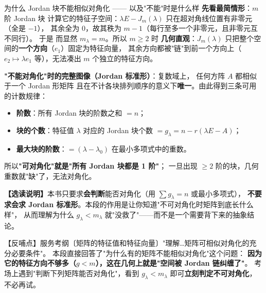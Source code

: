\begin{fdeep}{为什么 Jordan 块不能相似对角化 —— 以及"不能"时是什么样}
\textbf{先看最简情形}：$m$ 阶 Jordan 块
计算它的特征子空间：$\lambda E-J_{m}(\lambda)$ 只在超对角线位置有非零元（全是 $-1$），
其余全为 $0$，故其秩为 $m-1$（每行至多一个非零元，且非零元互不同行）。
于是
而显然 $m_{\lambda}=m$。所以 $m\ge2$ 时
\textbf{几何直观}：$J_{m}(\lambda)$ 只把整个空间的\textbf{一个方向}（$e_1$）固定为特征向量，
其余方向都被"链"到前一个方向上（$e_2\mapsto\lambda e_1$ 等），无法凑出 $m$ 个独立的特征方向。

\medskip
\textbf{"不能对角化"时的完整图像（Jordan 标准形）}：复数域上，
任何方阵 $A$ 都相似于一个 Jordan 形矩阵
且在不计各块排列顺序的意义下\textbf{唯一}。由此得到三条可用的计数规律：
\begin{itemize}[leftmargin=2.2em,itemsep=0.22em]
\item \textbf{阶数}：所有 Jordan 块的阶数之和 $=n$；
\item \textbf{块的个数}：特征值 $\lambda$ 对应的 Jordan 块个数 $=g_{\lambda}=n-r(\lambda E-A)$；
\item \textbf{最大块的阶数}：$=(\lambda-\lambda_0)$ 在最小多项式中的重数。
\end{itemize}
所以\textbf{"可对角化"就是"所有 Jordan 块都是 1 阶"}；
一旦出现 $\ge2$ 阶的块，几何重数就"缺"了，无法对角化。

\textbf{【选读说明】}本书只要求\textbf{会判断}能否对角化（用 $\sum g_{\lambda}=n$ 或最小多项式），
\textbf{不要求会求 Jordan 标准形}。本段的作用是让你知道"不可对角化时矩阵到底长什么样"，
从而理解为什么 $g_{\lambda}<m_{\lambda}$ 就"没救了"——而不是一个需要背下来的抽象结论。

【反哺点】服务考纲〔矩阵的特征值和特征向量〕"理解…矩阵可相似对角化的充分必要条件"。
本段直接回答了"为什么有的矩阵不能相似对角化"这个问题：
\textbf{因为它的特征方向不够多（$g<m$），这在几何上就是"空间被 Jordan 链纠缠了"}。
考场上遇到"判断下列矩阵能否对角化"，看到 $g_{\lambda}<m_{\lambda}$ 即可\textbf{立刻判定不可对角化}，不必再试。
\end{fdeep}
